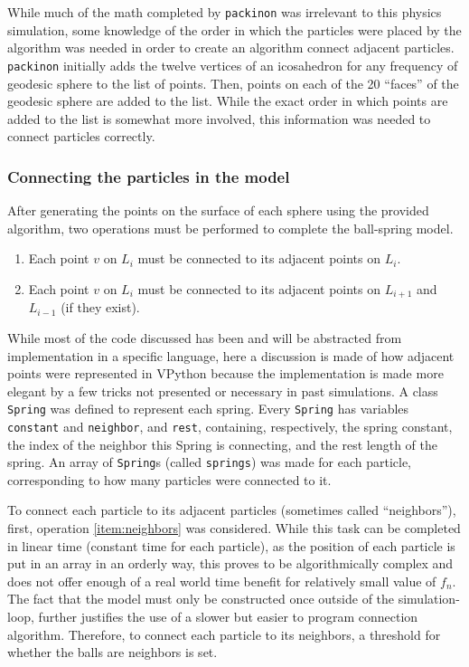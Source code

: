 \documentclass{article}
\begin{document}
While much of the math completed by \texttt{packinon} was irrelevant to this physics simulation, some knowledge of the order in which the particles were placed by the algorithm was needed in order to create an algorithm connect adjacent particles. \texttt{packinon} initially adds the twelve vertices of an icosahedron for any frequency of geodesic sphere to the list of points. Then, points on each of the 20 ``faces'' of the geodesic sphere are added to the list. While the exact order in which points are added to the list is somewhat more involved, this information was needed to connect particles correctly.

\subsubsection{Connecting the particles in the model}
After generating the points on the surface of each sphere using the provided algorithm, two operations must be performed to complete the ball-spring model. 
\begin{enumerate}
\item Each point $v$ on $L_{i}$ must be connected to its adjacent points on $L_{i}$. \label{item:neighbors}
\item Each point $v$ on $L_{i}$ must be connected to its adjacent points on $L_{i + 1}$ and $L_{i - 1}$ (if they exist). \label{item:nested}
\end{enumerate}

While most of the code discussed has been and will be abstracted from implementation in a specific language, here a discussion is made of how adjacent points were represented in VPython because the implementation is made more elegant by a few tricks not presented or necessary in past simulations. A class \texttt{Spring} was defined to represent each spring. Every \texttt{Spring} has variables \texttt{constant} and \texttt{neighbor}, and \texttt{rest}, containing, respectively, the spring constant, the index of the neighbor this Spring is connecting, and the rest length of the spring. An array of \texttt{Spring}s (called \texttt{springs}) was made for each particle, corresponding to how many particles were connected to it.

To connect each particle to its adjacent particles (sometimes called ``neighbors''), first, operation \ref{item:neighbors} was considered. While this task can be completed in linear time (constant time for each particle), as the position of each particle is put in an array in an orderly way, this proves to be algorithmically complex and does not of\mbox{f}er enough of a real world time benefit for relatively small value of $f_{n}$. The fact that the model must only be constructed once outside of the simulation-loop, further justif\mbox{i}es the use of a slower but easier to program connection algorithm. Therefore, to connect each particle to its neighbors, a threshold for whether the balls are neighbors is set. 
\end{document}
